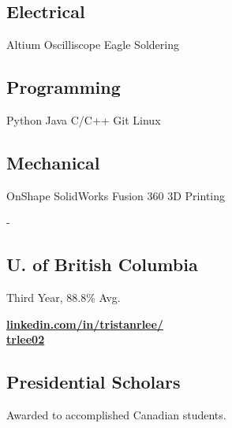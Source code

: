 \documentclass[a4paper]{MagicalCV}
\begin{document}
\sectionsep

\begin{minipage}[t]{0.3\textwidth} 


\subsection{Electrical}
Altium \textbullet{} Oscilliscope \textbullet{} Eagle \textbullet{} Soldering 
\sectionsep
\subsection{Programming}
Python \textbullet{} Java \textbullet{} C/C++ \textbullet{} Git \textbullet{} Linux

\sectionsep
\subsection{Mechanical}
OnShape \textbullet{} SolidWorks \textbullet{} Fusion 360 \textbullet{} 3D Printing

 -

\subsection{U. of British Columbia}
\vspace{\topsep} %
Third Year, 88.8\% Avg.


 \href{https://www.linkedin.com/in/tristanrlee/}{\bf linkedin.com/in/tristanrlee/}\\
 \href{https://github.com/trlee02/}{\bf trlee02} 
\sectionsep


\subsection{Presidential Scholars}
\vspace{\topsep} %
Awarded to accomplished Canadian students.
\sectionsep

\end{minipage}
\end{document}
